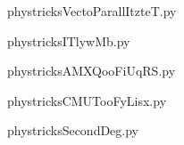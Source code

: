     \clearpage
    


    \newcommand{\CaptionFigVectoParallItzteT}{<+Type your caption here+>}
    \begin{center}
        
    \end{center}
    phystricksVectoParallItzteT.py

    

    \clearpage
    


    \newcommand{\CaptionFigITlywMb}{<+Type your caption here+>}
    \begin{center}
        
    \end{center}
    phystricksITlywMb.py

    

    \clearpage
    


    \newcommand{\CaptionFigAMXQooFiUqRS}{<+Type your caption here+>}
    \begin{center}
        
    \end{center}
    phystricksAMXQooFiUqRS.py

    

    \clearpage
    


    \newcommand{\CaptionFigCMUTooFyLisx}{<+Type your caption here+>}
    \begin{center}
        
    \end{center}
    phystricksCMUTooFyLisx.py

    

    \clearpage
    


    \newcommand{\CaptionFigSecondDeg}{<+Type your caption here+>}
    \begin{center}
        
    \end{center}
    phystricksSecondDeg.py

    

    \clearpage
    


